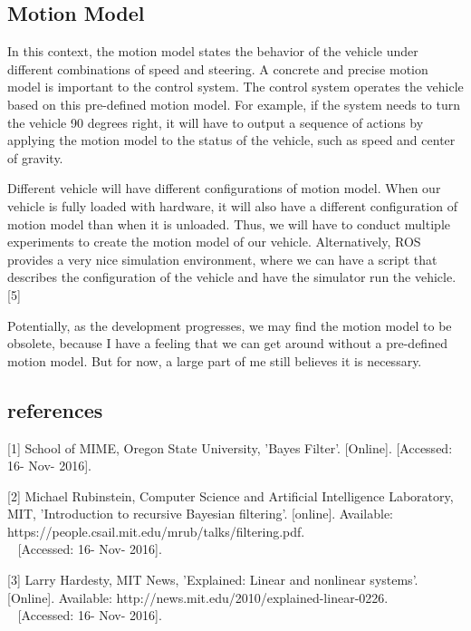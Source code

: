\documentclass[compsoc,draftclsnofoot,onecolumn,10pt]{IEEEtran}
\begin{document}
\subsection{Motion Model}
In this context, the motion model states the behavior of the vehicle under different 
combinations of speed and steering. A concrete and precise motion model is important to 
the control system. The control system operates the vehicle based on this pre-defined 
motion model. For example, if the system needs to turn the vehicle 90 degrees right, it 
will have to output a sequence of actions by applying the motion model to the status of 
the vehicle, such as speed and center of gravity.\par

Different vehicle will have different configurations of motion model. When our vehicle 
is fully loaded with hardware, it will also have a different configuration of motion 
model than when it is unloaded. Thus, we will have to conduct multiple experiments to 
create the motion model of our vehicle. Alternatively, ROS provides a very nice simulation 
environment, where we can have a script that describes the configuration of the vehicle 
and have the simulator run the vehicle. [5]\par

Potentially, as the development progresses, we may find the motion model to be obsolete, 
because I have a feeling that we can get around without a pre-defined motion model. But 
for now, a large part of me still believes it is necessary.\par

\subsection{references}
[1] School of MIME, Oregon State University, 'Bayes Filter'. [Online].
[Accessed: 16- Nov- 2016].\par

[2] Michael Rubinstein, Computer Science and Artificial Intelligence Laboratory, 
MIT, 'Introduction to recursive Bayesian filtering'. [online]. 
Available: https://people.csail.mit.edu/mrub/talks/filtering.pdf.\\~
[Accessed: 16- Nov- 2016].\par  

[3] Larry Hardesty, MIT News, 'Explained: Linear and nonlinear systems'. [Online].
Available: http://news.mit.edu/2010/explained-linear-0226.\\~
[Accessed: 16- Nov- 2016].\par
\end{document}
